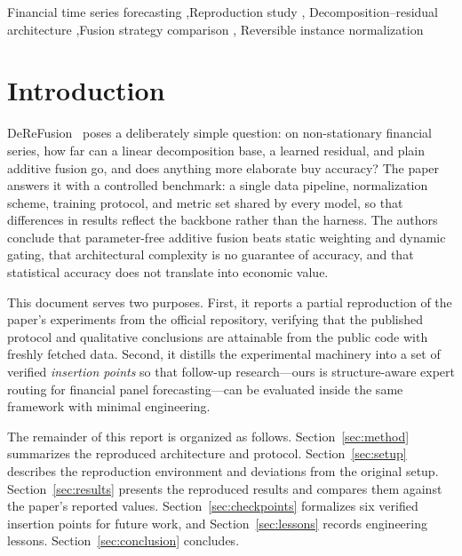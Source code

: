 \documentclass[preprint,12pt]{elsarticle}
\begin{document}
\begin{frontmatter}
\begin{keyword}
Financial time series forecasting \sep Reproduction study \sep
Decomposition--residual architecture \sep Fusion strategy comparison \sep
Reversible instance normalization
\end{keyword}

\end{frontmatter}


\section{Introduction}
\label{sec:intro}

DeReFusion~\cite{hsieh2026derefusion} poses a deliberately simple question:
on non-stationary financial series, how far can a linear decomposition base,
a learned residual, and plain additive fusion go, and does anything more
elaborate buy accuracy? The paper answers it with a controlled benchmark: a
single data pipeline, normalization scheme, training protocol, and metric
set shared by every model, so that differences in results reflect the
backbone rather than the harness. The authors conclude that parameter-free
additive fusion beats static weighting and dynamic gating, that
architectural complexity is no guarantee of accuracy, and that statistical
accuracy does not translate into economic value.

This document serves two purposes. First, it reports a partial reproduction
of the paper's experiments from the official repository, verifying that the
published protocol and qualitative conclusions are attainable from the
public code with freshly fetched data. Second, it distills the experimental
machinery into a set of verified \emph{insertion points} so that follow-up
research---ours is structure-aware expert routing for financial panel
forecasting---can be evaluated inside the same framework with minimal
engineering.

The remainder of this report is organized as follows.
Section~\ref{sec:method} summarizes the reproduced architecture and
protocol. Section~\ref{sec:setup} describes the reproduction environment
and deviations from the original setup. Section~\ref{sec:results} presents
the reproduced results and compares them against the paper's reported
values. Section~\ref{sec:checkpoints} formalizes six verified insertion
points for future work, and Section~\ref{sec:lessons} records engineering
lessons. Section~\ref{sec:conclusion} concludes.
\end{document}
